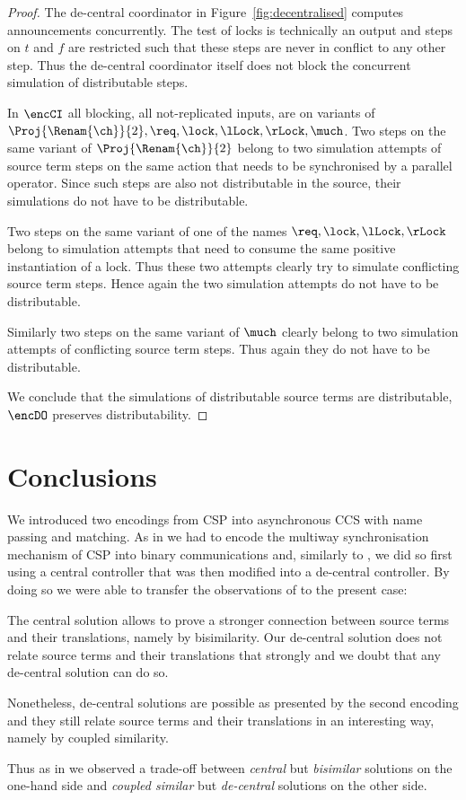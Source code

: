 \documentclass[]{eptcs}
\begin{document}
\begin{proof}
	The de-central coordinator in Figure~\ref{fig:decentralised} computes announcements concurrently. The test of locks is technically an output and steps on $ t $ and $ f $ are restricted such that these steps are never in conflict to any other step. Thus the de-central coordinator itself does not block the concurrent simulation of distributable steps.
	
	In $ \encCI $ all blocking, \ie all not-replicated inputs, are on variants of $ \Proj{\Renam{\ch}}{2}, \req, \lock, \lLock, \rLock, \much $. Two steps on the same variant of $ \Proj{\Renam{\ch}}{2} $ belong to two simulation attempts of source term steps on the same action that needs to be synchronised by a parallel operator. Since such steps are also not distributable in the source, their simulations do not have to be distributable.
	
	Two steps on the same variant of one of the names $ \req, \lock, \lLock, \rLock $ belong to simulation attempts that need to consume the same positive instantiation of a lock. Thus these two attempts clearly try to simulate conflicting source term steps. Hence again the two simulation attempts do not have to be distributable.
	
	Similarly two steps on the same variant of $ \much $ clearly belong to two simulation attempts of conflicting source term steps. Thus again they do not have to be distributable.
	
	We conclude that the simulations of distributable source terms are distributable, \ie $ \encDO $ preserves distributability.
\end{proof}


\section{Conclusions}
\label{sec:conclusion}

We introduced two encodings from CSP into asynchronous CCS with name passing and matching.
As in \cite{parrowCoupled92} we had to encode the multiway synchronisation mechanism of CSP into binary communications and, similarly to \cite{parrowCoupled92}, we did so first using a central controller that was then modified into a de-central controller.
By doing so we were able to transfer the observations of \cite{parrowCoupled92} to the present case:
\begin{compactenum}
	\item The central solution allows to prove a stronger connection between source terms and their translations, namely by bisimilarity. Our de-central solution does not relate source terms and their translations that strongly and we doubt that any de-central solution can do so.
	\item Nonetheless, de-central solutions are possible as presented by the second encoding and they still relate source terms and their translations in an interesting way, namely by coupled similarity.
\end{compactenum}
Thus as in \cite{parrowCoupled92} we observed a trade-off between \emph{central} but \emph{bisimilar} solutions on the one-hand side and \emph{coupled similar} but \emph{de-central} solutions on the other side.
\end{document}
